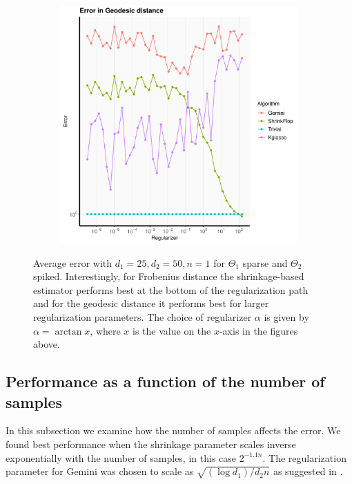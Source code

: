 \documentclass[aos]{imsart}
\theoremstyle{definition}
\numberwithin{equation}{section}
\begin{document}
\begin{figure}
\begin{subfigure}[b]{.4\textwidth}
         \includegraphics[width=\textwidth]{./code/zhou-comparison/25-50-sparse-geo.pdf}
         \end{subfigure}
\caption{Average error with $d_1 = 25, d_2 = 50, n = 1$ for $\Theta_1$ sparse and $\Theta_2$ spiked. Interestingly, for Frobenius distance the shrinkage-based estimator performs best at the bottom of the regularization path and for the geodesic distance it performs best for larger regularization parameters. 
The choice of regularizer $\alpha$ is given by $\alpha = \arctan{x}$, where $x$ is the value on the $x$-axis in the figures above.}\label{fig:sparse-i}
\end{figure}



\subsection{Performance as a function of the number of samples}

In this subsection we examine how the number of samples affects the error. We found best performance when the shrinkage parameter scales inverse exponentially with the number of samples, in this case $2^{-1.1 n}$. The regularization parameter for Gemini was chosen to scale as $\sqrt{(\log d_1) / d_2 n}$ as suggested in \cite{zhou2014gemini}.
\end{document}
